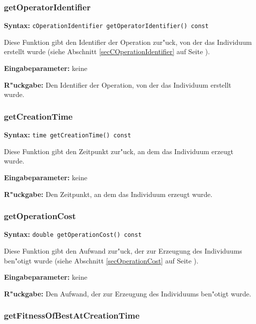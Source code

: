 \subsubsection{getOperatorIdentifier}

\textbf{Syntax:} \verb|cOperationIdentifier getOperatorIdentifier() const|

\bigskip\noindent
Diese Funktion gibt den Identifier der Operation zur"uck, von der das Individuum erstellt wurde (siehe Abschnitt \ref{secCOperationIdentifier} auf Seite \pageref{secCOperationIdentifier}).

\bigskip\noindent
\textbf{Eingabeparameter:} keine

\bigskip\noindent
\textbf{R"uckgabe:} Den Identifier der Operation, von der das Individuum erstellt wurde.


\subsubsection{getCreationTime}

\textbf{Syntax:} \verb|time getCreationTime() const|

\bigskip\noindent
Diese Funktion gibt den Zeitpunkt zur"uck, an dem das Individuum erzeugt wurde.

\bigskip\noindent
\textbf{Eingabeparameter:} keine

\bigskip\noindent
\textbf{R"uckgabe:} Den Zeitpunkt, an dem das Individuum erzeugt wurde.


\subsubsection{getOperationCost}

\textbf{Syntax:} \verb|double getOperationCost() const|

\bigskip\noindent
Diese Funktion gibt den Aufwand zur"uck, der zur Erzeugung des Individuums ben"otigt wurde
(siehe Abschnitt \ref{secOperationCost} auf Seite \pageref{secOperationCost}).

\bigskip\noindent
\textbf{Eingabeparameter:} keine

\bigskip\noindent
\textbf{R"uckgabe:} Den Aufwand, der zur Erzeugung des Individuums ben"otigt wurde.


\subsubsection{getFitnessOfBestAtCreationTime}

